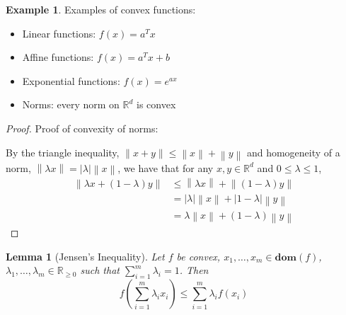 \documentclass[10pt]{article}
\newcommand{\abs}[1]{\left\lvert#1\right\rvert}   					%
\newcommand{\norm}[1]{\left\lVert#1\right\rVert}					%
\newcommand{\R}{\mathbb{R}}
\newcommand{\domain}[1]{\mathbf{dom}(#1)}
\newtheorem{lemma}[theorem]{Lemma}
\theoremstyle{remark}
\theoremstyle{definition}
\newtheorem{example}[theorem]{Example}
\begin{document}
\begin{example}
	Examples of convex functions:
	\begin{itemize}
		\item Linear functions: $f(x) = a^Tx$
		\item Affine functions: $f(x) = a^Tx + b$
		\item Exponential functions: $f(x) = e^{ax}$
		\item Norms: every norm on $\R^d$ is convex
	\end{itemize}
\end{example}
\begin{proof}
	Proof of convexity of norms:

	By the triangle inequality, $\norm{x+y} \leq \norm{x} + \norm{y}$ and homogeneity of a 
	norm, $\norm{\lambda x} = \abs{\lambda} \norm{x}$, we have that for any $x,y \in \R^d$ and $0 \leq \lambda \leq 1$,
	\begin{align*}
		\norm{\lambda x + (1-\lambda)y} & \leq \norm{\lambda x} + \norm{(1-\lambda)y}\\
		&= \abs{\lambda} \norm{x} + \abs{1-\lambda} \norm{y}\\
		&= \lambda \norm{x} + (1-\lambda) \norm{y}
	\end{align*}
\end{proof}
\begin{lemma}[Jensen's Inequality]
	Let $f$ be convex, $x_1, \ldots, x_m \in \domain{f}$, 
	$\lambda_1, \ldots, \lambda_m \in \R_{\geq 0}$ such that $\sum_{i=1}^m \lambda_i = 1$. Then
	\begin{equation}
		f\left(\sum_{i=1}^m \lambda_i x_i\right) \leq \sum_{i=1}^m \lambda_i f(x_i)
	\end{equation}
	 
\end{lemma}
\end{document}
